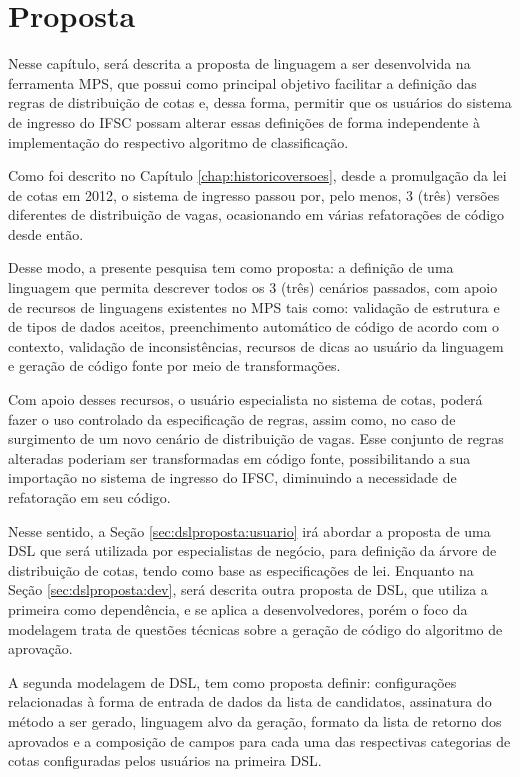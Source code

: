 \chapter{Proposta}
\label{chap:proposta}

   Nesse capítulo, será descrita a proposta de linguagem a ser desenvolvida na ferramenta \gls{MPS}, que possui como principal objetivo facilitar a definição das regras de distribuição de cotas e, dessa forma, permitir que os usuários do sistema de ingresso do \gls{IFSC} possam alterar essas definições de forma independente à implementação do respectivo algoritmo de classificação.
   
   Como foi descrito no Capítulo \ref{chap:historicoversoes}, desde a promulgação da lei de cotas em 2012, o sistema de ingresso passou por, pelo menos, 3 (três) versões diferentes de distribuição de vagas, ocasionando em várias refatorações de código desde então. 
   
   Desse modo, a presente pesquisa tem como proposta: a definição de uma linguagem que permita descrever todos os 3 (três) cenários passados, com apoio de recursos de linguagens existentes no \gls{MPS} tais como: validação de estrutura e de tipos de dados aceitos, preenchimento automático de código de acordo com o contexto, validação de inconsistências, recursos de dicas ao usuário da linguagem e geração de código fonte por meio de transformações. 
   
   Com apoio desses recursos, o usuário especialista no sistema de cotas, poderá fazer o uso controlado da especificação de regras, assim como, no caso de surgimento de um novo cenário de distribuição de vagas. Esse conjunto de regras alteradas poderiam ser transformadas em código fonte, possibilitando a  sua importação no sistema de ingresso do \gls{IFSC}, diminuindo a necessidade de refatoração em seu código.
   
   Nesse sentido, a Seção \ref{sec:dslproposta:usuario} irá abordar a proposta de uma \gls{DSL} que será utilizada por especialistas de negócio, para definição da árvore de distribuição de cotas, tendo como base as especificações de lei. Enquanto na Seção \ref{sec:dslproposta:dev}, será descrita outra proposta de \gls{DSL}, que utiliza a primeira como dependência, e se aplica a desenvolvedores, porém o foco da modelagem trata de questões técnicas sobre a geração de código do algoritmo de aprovação.
   
   A segunda modelagem de \gls{DSL}, tem como proposta definir: configurações relacionadas à forma de entrada de dados da lista de candidatos, assinatura do método a ser gerado, linguagem alvo da geração, formato da lista de retorno dos aprovados e a composição de campos para cada uma das respectivas categorias de cotas configuradas pelos usuários na primeira \gls{DSL}.
   
   

   
   
   
   
   
